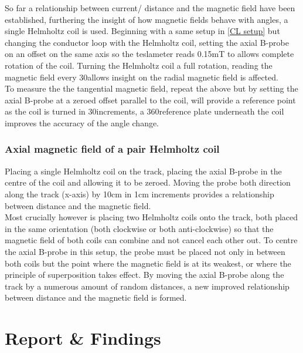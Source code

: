 \documentclass[12pt]{article}
\begin{document}
So far a relationship between current/ distance and the magnetic field have been established, furthering the insight of how magnetic fields behave with angles, a single Helmholtz coil is used. Beginning with a same setup in \cref{CL setup} but changing the conductor loop with the Helmholtz coil, setting the axial B-probe on an offset on the same axis so the teslameter reads 0.15mT to allows complete rotation of the coil. Turning the Helmholtz coil a full rotation, reading the magnetic field every 30\textdegree allows insight on the radial magnetic field is affected. \\

To measure the the tangential magnetic field, repeat the above but by setting the axial B-probe at a zeroed offset parallel to the coil, will provide a reference point as the coil is turned in 30\textdegree increments, a 360\textdegree reference plate underneath the coil improves the accuracy of the angle change. 

\subsubsection{Axial magnetic field of a pair Helmholtz coil}

Placing a single Helmholtz coil on the track, placing the axial B-probe in the centre of the coil and allowing it to be zeroed. Moving the probe both direction along the track (x-axis) by 10cm in 1cm increments provides a relationship between distance and the magnetic field. \\

Most crucially however is placing two Helmholtz coils onto the track, both placed in the same orientation (both clockwise or both anti-clockwise) so that the magnetic field of both coils can combine and not cancel each other out. To centre the axial B-probe in this setup, the probe must be placed not only in between both coils but the point where the magnetic field is at its weakest, or where the principle of superposition takes effect. By moving the axial B-probe along the track by a numerous amount of random distances, a new improved relationship between distance and the magnetic field is formed.

\section{Report \& Findings}
\label{equations}
\end{document}
